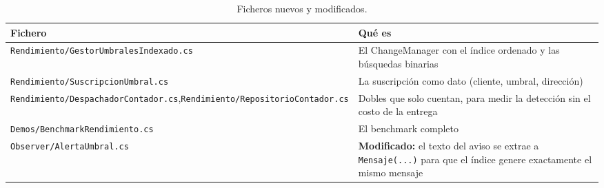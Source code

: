 \begin{table}[H]
\centering
\small
\begin{tabularx}{\textwidth}{>{\raggedright\arraybackslash}p{6.2cm} >{\raggedright\arraybackslash}X}
\toprule
\textbf{Fichero} & \textbf{Qué es} \\
\midrule
\texttt{Rendimiento/GestorUmbralesIndexado.cs} & El ChangeManager con el índice ordenado y las búsquedas binarias \\
\texttt{Rendimiento/SuscripcionUmbral.cs} & La suscripción como dato (cliente, umbral, dirección) \\
\texttt{Rendimiento/DespachadorContador.cs},\newline\texttt{Rendimiento/RepositorioContador.cs} & Dobles que solo cuentan, para medir la detección sin el costo de la entrega \\
\texttt{Demos/BenchmarkRendimiento.cs} & El benchmark completo \\
\texttt{Observer/AlertaUmbral.cs} & \textbf{Modificado:} el texto del aviso se extrae a \texttt{Mensaje(...)} para que el índice genere exactamente el mismo mensaje \\
\bottomrule
\end{tabularx}
\caption{Ficheros nuevos y modificados.}
\end{table}
